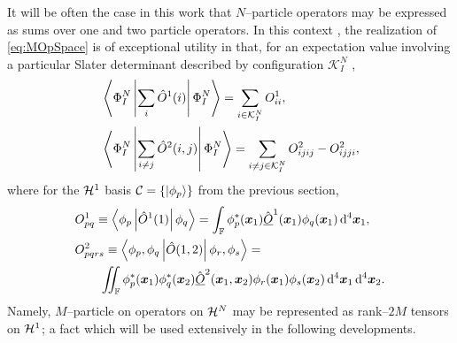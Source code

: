 It will be often the case in this work that $N$--particle operators may be expressed as sums over one and
two particle operators. In this context , the realization of \cref{eq:MOpSpace} is of exceptional utility in that,
for an expectation value involving a particular Slater determinant described by configuration $\mathcal{K}_I^N$
\cite{Ostlund12_book},
\begin{subequations}
  \label{eq:SlaterCondon}
\begin{align}
  &\left\langle \Phi^N_I \left\vert \sum_i\hat{O}^1(i) \right\vert \Phi^N_I \right\rangle = \sum_{i\in\mathcal{K}^N_I} O^1_{ii},\\
  &\left\langle \Phi^N_I \left\vert \sum_{i\neq j} \hat{O}^2(i,j) \right\vert \Phi^N_I \right\rangle = 
    \sum_{i\neq j \in\mathcal{K}^N_I} O^2_{ijij} - O^2_{ijji},
\end{align}
\end{subequations}
where for the $\mathcal{H}^1$ basis $\mathcal{C} = \left \lbrace \left\vert \phi_p \right\rangle \right\rbrace$ from the previous section,
\begin{subequations}
  \label{eq:DiracInts}
\begin{align}
  &O^1_{pq} \equiv \left\langle \phi_p \left\vert \hat{O}^1(1) \right\vert \phi_q \right\rangle = 
    \int_{\mathbb F} \phi_p^*(\boldsymbol{x}_1) \hat{\underline{O}}^1(\boldsymbol{x}_1) \phi_q(\boldsymbol{x}_1) \,\mathrm{d}^4 \boldsymbol{x}_1,\\
  &O^2_{pqrs} \equiv \left\langle \phi_p, \phi_q  \left\vert \hat{O}(1,2) \right\vert \phi_r, \phi_s \right\rangle = \nonumber \\ &\qquad
    \int\mkern-12mu\int_{\mathbb F} 
      \phi_p^*(\boldsymbol{x}_1) \phi_q^*(\boldsymbol{x}_2) \hat{\underline{O}}^2(\boldsymbol{x}_1,\boldsymbol{x}_2) 
      \phi_r(\boldsymbol{x}_1) \phi_s(\boldsymbol{x}_2) \,\mathrm{d}^4 \boldsymbol{x}_1 \,\mathrm{d}^4 \boldsymbol{x}_2.
\end{align}
\end{subequations}
Namely, $M$--particle on operators on $\mathcal{H}^N$ may be represented as rank--$2M$ tensors on $\mathcal{H}^1$; a fact which will
be used extensively in the following developments.



